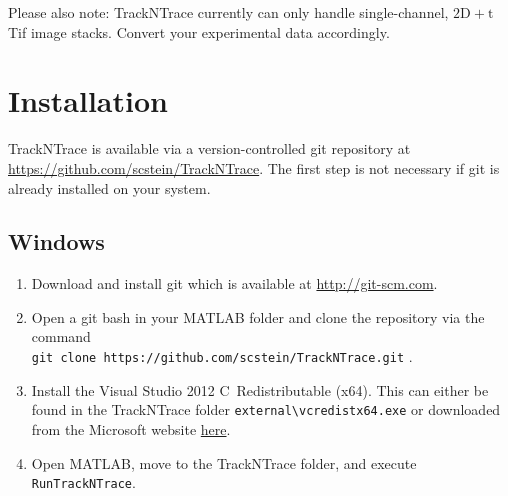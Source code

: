 \documentclass[11pt,onside]{report}
\numberwithin{equation}{chapter}
\def\CC{{C\nolinebreak[4]\hspace{-.05em}\raisebox{.3ex}{\tiny\bf ++}}}
\begin{document}
Please also note: TrackNTrace currently can only handle single-channel, $\mathrm{2D}+\mathrm{t}$ Tif image stacks. Convert your experimental data accordingly. \clearpage%

\tableofcontents \clearpage

\section{Installation}\label{sec:install}
TrackNTrace is available via a version-controlled git repository at \url{https://github.com/scstein/TrackNTrace}. The first step is not necessary if git is already installed on your system.
\subsection{Windows}
\begin{enumerate}
\item Download and install git which is available at \url{http://git-scm.com}.
\item Open a git bash in your MATLAB folder and clone the repository via the command \\ \texttt{git clone https://github.com/scstein/TrackNTrace.git} .
\item Install the Visual Studio 2012 \CC~Redistributable (x64). This can either be found in the TrackNTrace folder \texttt{external\textbackslash vcredist\textunderscore x64.exe} or downloaded from the Microsoft website \href{https://www.microsoft.com/en-us/download/details.aspx?id=30679}{here}.
\item Open MATLAB, move to the TrackNTrace folder, and execute \texttt{RunTrackNTrace}.
\end{enumerate}
\end{document}
